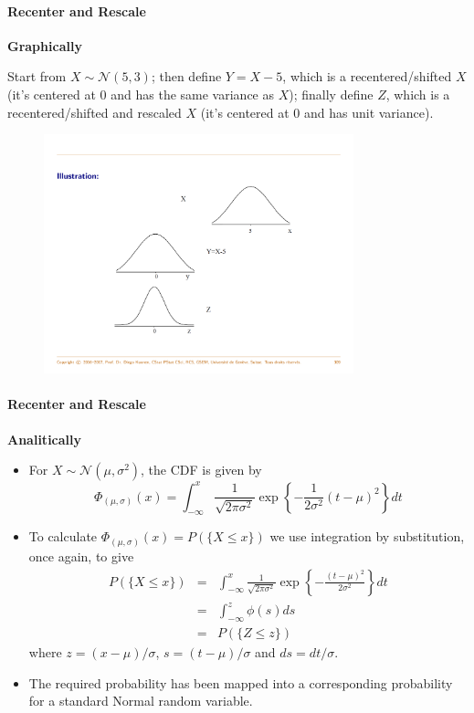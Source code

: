 \documentclass[notes=show,smaller]{beamer}\usepackage[]{graphicx}\usepackage[]{color}
\renewcommand{\Pr}{P}
\newcommand{\N}{\mathcal{N}}
\newenvironment{stepitemize}{\begin{itemize}[<+->]}{\end{itemize} }
\begin{document}
\begin{frame}{\subsecname}
\framesubtitle{Recenter and Rescale}
  \textbf{Graphically}

  Start from $X \sim \mathcal{N}(5,3)$; then define $Y=X-5$, which is a recentered/shifted $X$ (it's centered at 0 and has the same variance as $X$); finally define $Z$, which is a recentered/shifted and rescaled $X$ (it's centered at 0 and has unit variance).

  \begin{figure}[ptb]\centering
  \includegraphics[width=0.8\textwidth,height=0.65\textheight]{img/Std_Diego.pdf}
  \end{figure}
\end{frame}

\begin{frame}{\subsecname}
\framesubtitle{Recenter and Rescale}
  \textbf{Analitically}
  \begin{stepitemize}
  \item For $X\sim \N\left( \mu ,\sigma ^{2}\right) $, the CDF is given by%
  $$
  \Phi_{(\mu,\sigma)}\left( x\right) =\int_{-\infty }^{x}\frac{1}{\sqrt{2\pi \sigma ^{2}}}\exp{ \left\{ -\frac{1}{2\sigma ^{2}}\left( t-\mu \right) ^{2}\right\}} dt
  $$
  \item To calculate $\Phi_{(\mu,\sigma)}\left( x\right)=\Pr(\{X\leq x\})$ we use integration by substitution, once again, to give
  \begin{eqnarray*}
  \Pr(\{ X\leq x\} )&=&\int_{-\infty}^x\frac{1}{\sqrt{2\pi\sigma^2}}\exp{\left\{-\frac{(t-\mu)^2}{2\sigma^2}\right\}}dt\\
   &=&\int_{-\infty}^z\phi(s)ds\\
    &=&P(\{Z\leq z\})
  \end{eqnarray*}
  where $z=(x-\mu)/\sigma$, $s=(t-\mu)/\sigma$ and $ds=dt/\sigma$.
  \item The required probability has been mapped into a corresponding probability for a standard Normal random variable.
  \end{stepitemize}
\end{frame}
\end{document}
